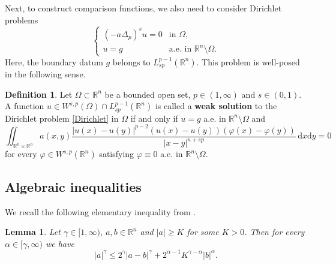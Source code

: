 \documentclass[10pt,letterpaper]{amsart}
\newtheorem{lemma}[theorem]{Lemma}
\theoremstyle{definition}
\newtheorem{definition}[theorem]{Definition}
\numberwithin{theorem}{section}
\numberwithin{equation}{section}
\newcommand{\R}{\ensuremath{\mathbb{R}}}
\newcommand{\1}{\ensuremath{\mathds{1}}}
\numberwithin{equation}{section}
\begin{document}
Next, to construct comparison functions, we also need to consider Dirichlet problems
\begin{equation}\label{Dirichlet} 
\left\{
    \begin{array}{cl}
      (- a\Delta_p)^s u  = 0 & \mbox{in $\Omega$,} \\[6pt]
      u = g & \mbox{a.e.~in $\R^n \setminus \Omega$.}
    \end{array}
\right.
\end{equation}
Here, the boundary datum $g$ belongs to $L^{p-1}_{sp}(\R^n)$.
This problem is well-posed in the following sense. 
\begin{definition}\label{def:weak-sol-D}
Let $\Omega\subset\mathbb R^n$ be a bounded open set, $p\in(1,\infty)$ and $s\in(0,1)$. A function $u\in W^{s,p}(\Omega)\cap L^{p-1}_{sp}(\R^n)$ is called a {\bf weak solution} to the Dirichlet problem \eqref{Dirichlet} in $\Omega$ if and only if $u=g$ a.e. in $\R^n\setminus\Omega$
and
\begin{equation*}
        \iint_{\mathbb R^n\times\mathbb R^n}a(x,y)\frac{|u(x)-u(y)|^{p-2}(u(x)-u(y))(\varphi(x)-\varphi(y))}{|x-y|^{n+sp}}\,\mathrm{d}x \mathrm{d}y =0
\end{equation*}
for every $\varphi\in W^{s,p}(\R^n)$ satisfying $\varphi\equiv0$ a.e. in $\R^n\setminus\Omega$.
\end{definition}


\subsection{Algebraic inequalities}
We recall the following elementary inequality from \cite[Lemma~2.3]{BDLM}.

\begin{lemma} \label{lem:elementary-superlevel}
Let $\gamma \in [1,\infty)$, $a,b \in \R^n$ and $|a| \geq K$ for some $K > 0$. Then 
for every $\alpha \in [\gamma,\infty)$
we have
\begin{equation*}
    |a|^\gamma \leq 2^\gamma |a-b|^\gamma + 2^{\alpha -1} K^{\gamma -\alpha} |b|^\alpha.
\end{equation*}
\end{lemma}
\end{document}
